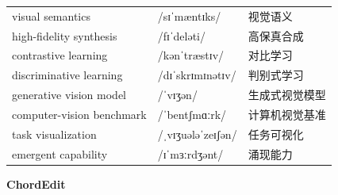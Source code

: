 \documentclass[UTF8,12pt,a4paper]{ctexart}
\providecommand{\zh}[1]{#1}
\begin{document}
\begin{tabular*}{\textwidth}{@{\extracolsep{\fill}}lll@{}}
visual semantics & {\ipafont /sɪˈmæntɪks/} & \zh{视觉语义} \\
high-fidelity synthesis & {\ipafont /fɪˈdeləti/} & \zh{高保真合成} \\
contrastive learning & {\ipafont /kənˈtræstɪv/} & \zh{对比学习} \\
discriminative learning & {\ipafont /dɪˈskrɪmɪnətɪv/} & \zh{判别式学习} \\
generative vision model & {\ipafont /ˈvɪʒən/} & \zh{生成式视觉模型} \\
computer-vision benchmark & {\ipafont /ˈbentʃmɑːrk/} & \zh{计算机视觉基准} \\
task visualization & {\ipafont /ˌvɪʒuələˈzeɪʃən/} & \zh{任务可视化} \\
emergent capability & {\ipafont /ɪˈmɜːrdʒənt/} & \zh{涌现能力} \\
\bottomrule
\end{tabular*}

\newpage

\begin{center}
    {\Large\bfseries ChordEdit}
\end{center}
\end{document}
